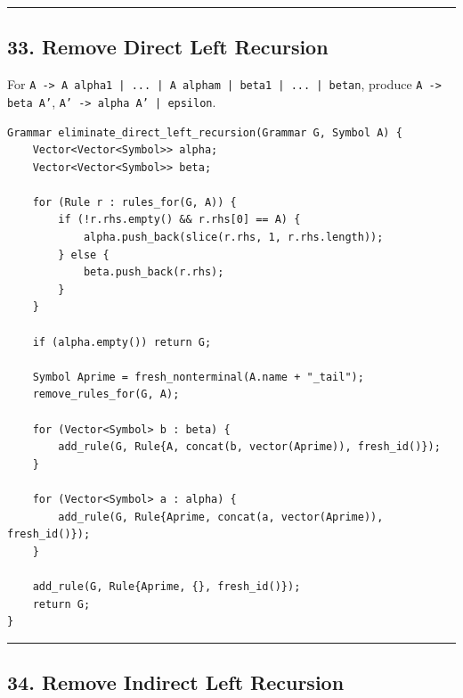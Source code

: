 \documentclass[10pt,letterpaper]{article}
\begin{document}
\medskip\hrule\medskip

\subsection*{33. Remove Direct Left Recursion}

For \texttt{A -> A alpha1 | ... | A alpham | beta1 | ... | betan}, produce \texttt{A -> beta A'}, \texttt{A' -> alpha A' | epsilon}.

\begin{verbatim}
Grammar eliminate_direct_left_recursion(Grammar G, Symbol A) {
    Vector<Vector<Symbol>> alpha;
    Vector<Vector<Symbol>> beta;

    for (Rule r : rules_for(G, A)) {
        if (!r.rhs.empty() && r.rhs[0] == A) {
            alpha.push_back(slice(r.rhs, 1, r.rhs.length));
        } else {
            beta.push_back(r.rhs);
        }
    }

    if (alpha.empty()) return G;

    Symbol Aprime = fresh_nonterminal(A.name + "_tail");
    remove_rules_for(G, A);

    for (Vector<Symbol> b : beta) {
        add_rule(G, Rule{A, concat(b, vector(Aprime)), fresh_id()});
    }

    for (Vector<Symbol> a : alpha) {
        add_rule(G, Rule{Aprime, concat(a, vector(Aprime)), fresh_id()});
    }

    add_rule(G, Rule{Aprime, {}, fresh_id()});
    return G;
}
\end{verbatim}

\medskip\hrule\medskip

\subsection*{34. Remove Indirect Left Recursion}
\end{document}
